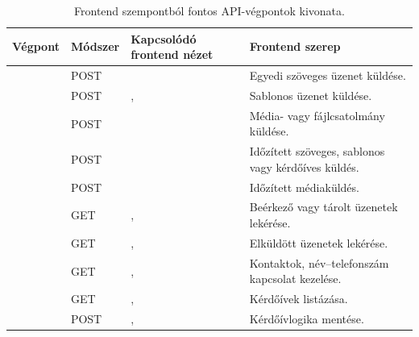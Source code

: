 \begin{table}[H]
\centering
\caption{Frontend szempontból fontos API-végpontok kivonata.}
\label{tab:melleklet-api-vegpontok}
\footnotesize
\setlength{\tabcolsep}{3pt}
\renewcommand{\arraystretch}{1.25}

\begin{tabularx}{\textwidth}{|>{\raggedright\arraybackslash}p{}|>{\raggedright\arraybackslash}p{}|>{\raggedright\arraybackslash}p{}|Y|}
\hline
\textbf{Végpont} &
\textbf{Módszer} &
\textbf{Kapcsolódó frontend nézet} &
\textbf{Frontend szerep} \\
\hline

 &
POST &
 &
Egyedi szöveges üzenet küldése. \\
\hline

 &
POST &
,  &
Sablonos üzenet küldése. \\
\hline

 &
POST &
 &
Média- vagy fájlcsatolmány küldése. \\
\hline

 &
POST &
 &
Időzített szöveges, sablonos vagy kérdőíves küldés. \\
\hline

 &
POST &
 &
Időzített médiaküldés. \\
\hline

 &
GET &
,  &
Beérkező vagy tárolt üzenetek lekérése. \\
\hline

 &
GET &
,  &
Elküldött üzenetek lekérése. \\
\hline

 &
GET &
,  &
Kontaktok, név--telefonszám kapcsolat kezelése. \\
\hline

 &
GET &
,  &
Kérdőívek listázása. \\
\hline

 &
POST &
,  &
Kérdőívlogika mentése. \\
\hline

\end{tabularx}
\end{table}

